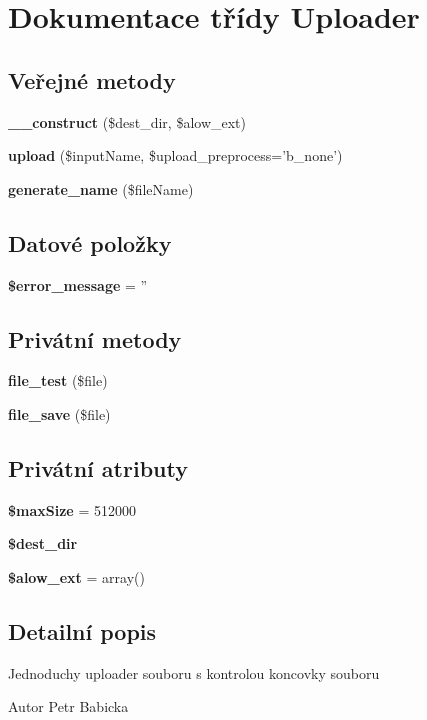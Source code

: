 \section{Dokumentace třídy Uploader}
\label{d4/d3b/class_uploader}
\subsection*{Veřejné metody}
\begin{DoxyCompactItemize}
\item 
{\bf \_\-\_\-construct} (\$dest\_\-dir, \$alow\_\-ext)
\item 
{\bf upload} (\$inputName, \$upload\_\-preprocess='b\_\-none')
\item 
{\bf generate\_\-name} (\$fileName)
\end{DoxyCompactItemize}
\subsection*{Datové položky}
\begin{DoxyCompactItemize}
\item 
{\bf \$error\_\-message} = ''
\end{DoxyCompactItemize}
\subsection*{Privátní metody}
\begin{DoxyCompactItemize}
\item 
{\bf file\_\-test} (\$file)
\item 
{\bf file\_\-save} (\$file)
\end{DoxyCompactItemize}
\subsection*{Privátní atributy}
\begin{DoxyCompactItemize}
\item 
{\bf \$maxSize} = 512000
\item 
{\bf \$dest\_\-dir}
\item 
{\bf \$alow\_\-ext} = array()
\end{DoxyCompactItemize}


\subsection{Detailní popis}
Jednoduchy uploader souboru s kontrolou koncovky souboru \begin{DoxyAuthor}{Autor}
Petr Babicka 
\end{DoxyAuthor}


